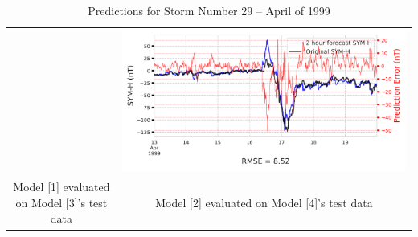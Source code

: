 \documentclass[draft,sw]{agutexSI2019}
\begin{document}
\begin{table}
\begin{tabular}{cc}
&
\includegraphics[width=0.49\linewidth]{paper_plots/2h_swics_model_on_no_swics/2h_swics_model_on_no_swics_storm_29.png}
\\
Model [1] evaluated on Model [3]'s test data & Model [2] evaluated on Model [4]'s test data
\vspace*{12pt}
\\
\end{tabular}
\caption{Predictions for Storm Number 29 -- April of 1999}
\label{storm-29}
\end{table}
\end{document}
